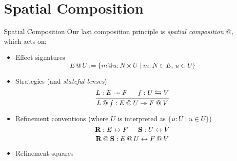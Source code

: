 \documentclass[aspectratio=1610,mathserif]{beamer}
\begin{document}
\section{Spatial Composition}

%
%

\begin{frame}{Spatial Composition} %
  Our last composition principle is \emph{spatial composition} $\mathbin@$,
  which acts on:
  \pause
  \begin{itemize}
    \item Effect signatures
    \[
      E \mathbin@ U := \{ m @ u \mathbin: N \times U \mid
            m\mathbin:N \in E, \, u \in U \}
    \]

    \pause
    \item Strategies (and \emph{stateful lenses})
      \[
        \begin{prooftree}
          \hypo{L : E \twoheadrightarrow F}
          \hypo{f : U \leftrightarrows V}
          \infer2{L \mathbin@ f : E \mathbin@ U \twoheadrightarrow
                                  F \mathbin@ V}
        \end{prooftree}
      \]

    \pause
    \item Refinement conventions (where $U$ is interpreted as
         $\{ u : U \mid u \in U \}$)
      \[
        \begin{prooftree}
          \hypo{\mathbf{R} : E \leftrightarrow F}
          \hypo{\mathbf{S} : 
            U
            \leftrightarrow
            V}
          \infer2{\mathbf{R} \mathbin@ \mathbf{S} :
                    E \mathbin@ U \leftrightarrow
                                  F \mathbin@ V}
        \end{prooftree}
      \]

    \pause
    \item Refinement squares
  \end{itemize}
\end{frame}
\end{document}
